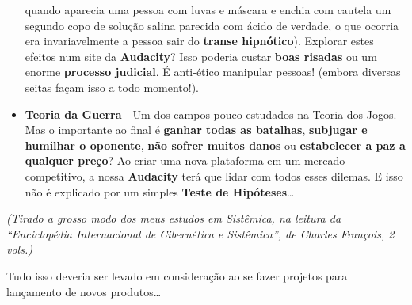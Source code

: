 \documentclass[11pt]{article}
\begin{document}
\begin{itemize}
  quando aparecia uma pessoa com luvas e máscara e enchia com cautela um
  segundo copo de solução salina parecida com ácido de verdade, o que
  ocorria era invariavelmente a pessoa sair do \textbf{transe
  hipnótico}). Explorar estes efeitos num site da \textbf{Audacity}?
  Isso poderia custar \textbf{boas risadas} ou um enorme
  \textbf{processo judicial}. É anti-ético manipular pessoas! (embora
  diversas seitas façam isso a todo momento!).
\item
  \textbf{Teoria da Guerra} - Um dos campos pouco estudados na Teoria
  dos Jogos. Mas o importante ao final é \textbf{ganhar todas as
  batalhas}, \textbf{subjugar e humilhar o oponente}, \textbf{não sofrer
  muitos danos} ou \textbf{estabelecer a paz a qualquer preço}? Ao criar
  uma nova plataforma em um mercado competitivo, a nossa
  \textbf{Audacity} terá que lidar com todos esses dilemas. E isso não é
  explicado por um simples \textbf{Teste de Hipóteses}\ldots{}
\end{itemize}

\emph{(Tirado a grosso modo dos meus estudos em Sistêmica, na leitura da
``Enciclopédia Internacional de Cibernética e Sistêmica'', de Charles
François, 2 vols.)}

Tudo isso deveria ser levado em consideração ao se fazer projetos para
lançamento de novos produtos\ldots{}


    
    
    
    
\end{document}
